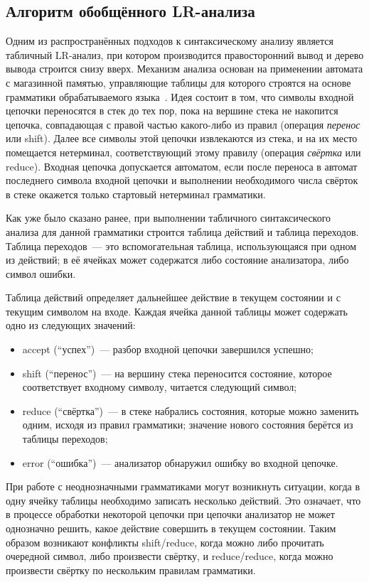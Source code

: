 \subsection{Алгоритм обобщённого LR-анализа}

Одним из распространённых подходов к синтаксическому анализу является табличный LR-анализ, при котором производится правосторонний вывод и дерево вывода строится снизу вверх. Механизм анализа основан на применении автомата с магазинной памятью, управляющие таблицы для которого строятся на основе грамматики обрабатываемого языка~\cite{Grune}. Идея состоит в том, что символы входной цепочки переносятся в стек до тех пор, пока на вершине стека не накопится цепочка, совпадающая с правой частью какого-либо из правил (операция \textit{перенос} или shift). Далее все символы этой цепочки извлекаются из стека, и на их место помещается нетерминал, соответствующий этому правилу (операция \textit{свёртка} или  reduce). Входная цепочка допускается автоматом, если после переноса в автомат последнего символа входной цепочки и выполнении необходимого числа свёрток в стеке окажется только стартовый нетерминал грамматики.

Как уже было сказано ранее, при выполнении табличного синтаксического анализа для данной грамматики строится таблица действий и таблица переходов. Таблица переходов~--- это вспомогательная таблица, использующаяся при одном из действий; в её ячейках может содержатся либо состояние анализатора, либо символ ошибки.

Таблица действий определяет дальнейшее действие в текущем состоянии и с текущим символом на входе. Каждая ячейка данной таблицы может содержать одно из следующих значений:
\begin{itemize}
    \item accept (``успех'')~--- разбор входной цепочки завершился успешно;
    \item shift (``перенос'')~--- на вершину стека переносится состояние, которое соответствует входному символу, читается следующий символ;
    \item reduce (``свёртка'')~--- в стеке набрались состояния, которые можно заменить одним, исходя из правил грамматики; значение нового состояния берётся из таблицы переходов;
    \item error (``ошибка'')~--- анализатор обнаружил ошибку во входной цепочке.
\end{itemize}

При работе с неоднозначными грамматиками могут возникнуть ситуации, когда в одну ячейку таблицы необходимо записать несколько действий. Это означает, что в процессе обработки некоторой цепочки при цепочки анализатор не может однозначно решить, какое действие совершить в текущем состоянии. Таким образом возникают конфликты shift/reduce, когда можно либо прочитать очередной символ, либо произвести свёртку, и reduce/reduce, когда можно произвести свёртку по нескольким правилам грамматики.

